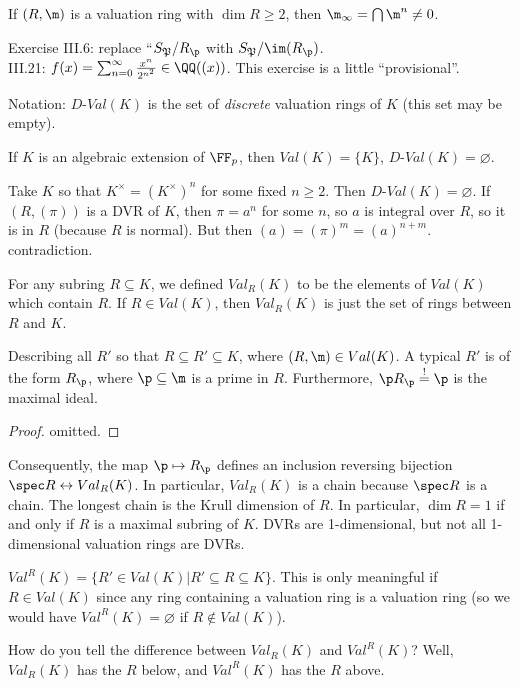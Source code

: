 \begin{corollary}
  If $(R,\m)$ is a valuation ring with $\dim R\ge 2$, then $\m_\infty = \bigcap \m^n \neq
  0$.
\end{corollary}
 Exercise III.6: replace ``$S_\mathfrak{P}/R_\p$ with $S_\mathfrak{P}/\im (R_\p)$.\\
 III.21: $f(x) = \sum_{n=0}^\infty \frac{x^n}{2^{n^2}} \in \QQ((x))$. This exercise is a
 little ``provisional''.

 Notation: $D$-$Val(K)$ is the set of \emph{discrete} valuation rings of $K$ (this set
 may be empty).
 \begin{example}
   If $K$ is an algebraic extension of $\FF_p$, then $Val(K)=\{K\}$,
   $D$-$Val(K)=\varnothing$.
 \end{example}
 \begin{example}
   Take $K$ so that $K^\times = (K^\times)^n$ for some fixed $n\ge 2$. Then
   $D$-$Val(K)=\varnothing$. If $(R,(\pi))$ is a DVR of $K$, then $\pi=a^n$ for some $n$,
   so $a$ is integral over $R$, so it is in $R$ (because $R$ is normal). But then
   $(a)=(\pi)^m = (a)^{n+m}$. contradiction.
 \end{example}

 For any subring $R\subseteq K$, we defined $Val_R(K)$ to be the elements of $Val(K)$
 which contain $R$. If $R\in Val(K)$, then $Val_R(K)$ is just the set of rings between
 $R$ and $K$.

 \begin{theorem}[4.12]
   Describing all $R'$ so that $R\subseteq R'\subseteq K$, where $(R,\m)\in Val(K)$. A
   typical $R'$ is of the form $R_\p$, where $\p\subseteq \m$ is a prime in
   $R$. Furthermore, $\p R_\p \overset{!}{=} \p$ is the maximal ideal.
 \end{theorem}
 \begin{proof}
   omitted.\anton{}
 \end{proof}
 Consequently, the map $\p\mapsto R_\p$ defines an inclusion reversing bijection $\spec R
 \leftrightarrow Val_R(K)$. In particular, $Val_R(K)$ is a chain because $\spec R$ is a
 chain. The longest chain is the Krull dimension of $R$. In particular, $\dim R=1$ if and
 only if $R$ is a maximal subring of $K$. DVRs are 1-dimensional, but not all
 1-dimensional valuation rings are DVRs.

 \begin{definition}
   $Val^R(K) = \{R' \in Val(K)| R'\subseteq R\subseteq K\}$. This is only meaningful if
   $R\in Val(K)$ since any ring containing a valuation ring is a valuation ring (so we
   would have $Val^R(K)=\varnothing$ if $R\not\in Val(K)$).
 \end{definition}
 How do you tell the difference between $Val_R(K)$ and $Val^R(K)$? Well, $Val_R(K)$ has
 the $R$ below, and $Val^R(K)$ has the $R$ above.

